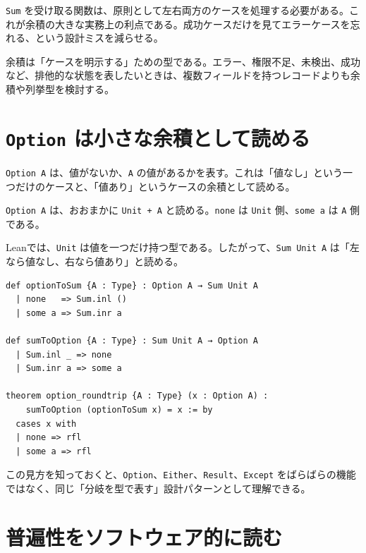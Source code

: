 \texttt{Sum} を受け取る関数は、原則として左右両方のケースを処理する必要がある。これが余積の大きな実務上の利点である。成功ケースだけを見てエラーケースを忘れる、という設計ミスを減らせる。

\begin{softwarebox}
余積は「ケースを明示する」ための型である。エラー、権限不足、未検出、成功など、排他的な状態を表したいときは、複数フィールドを持つレコードよりも余積や列挙型を検討する。
\end{softwarebox}

\section{\texttt{Option} は小さな余積として読める}

\texttt{Option A} は、値がないか、\texttt{A} の値があるかを表す。これは「値なし」という一つだけのケースと、「値あり」というケースの余積として読める。

\begin{intuitionbox}
\texttt{Option A} は、おおまかに \texttt{Unit + A} と読める。\texttt{none} は \texttt{Unit} 側、\texttt{some a} は \texttt{A} 側である。
\end{intuitionbox}

Leanでは、\texttt{Unit} は値を一つだけ持つ型である。したがって、\texttt{Sum Unit A} は「左なら値なし、右なら値あり」と読める。

\begin{listing}[htbp]
\begin{verbatim}
def optionToSum {A : Type} : Option A → Sum Unit A
  | none   => Sum.inl ()
  | some a => Sum.inr a

def sumToOption {A : Type} : Sum Unit A → Option A
  | Sum.inl _ => none
  | Sum.inr a => some a

theorem option_roundtrip {A : Type} (x : Option A) :
    sumToOption (optionToSum x) = x := by
  cases x with
  | none => rfl
  | some a => rfl
\end{verbatim}
\caption{OptionをSum Unit Aとして読む}
\label{lst:ch07_option_sum}
\end{listing}

この見方を知っておくと、\texttt{Option}、\texttt{Either}、\texttt{Result}、\texttt{Except} をばらばらの機能ではなく、同じ「分岐を型で表す」設計パターンとして理解できる。

\section{普遍性をソフトウェア的に読む}
\label{sec:ch07-universal-property}


